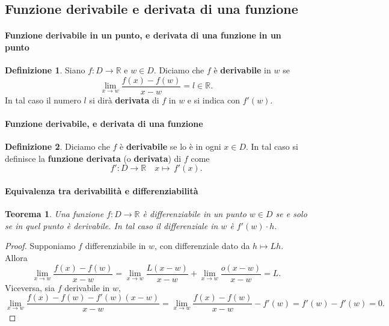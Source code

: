 \documentclass{article}
\theoremstyle{plain}
\newtheorem{thm}{Teorema}[section]
\theoremstyle{definition}
\newtheorem{defn}{Definizione}[section]
\theoremstyle{remark}
\begin{document}
\vspace{10pt}

\subsection{Funzione derivabile e derivata di una funzione}

\vspace{10pt}

\paragraph{Funzione derivabile in un punto, e derivata di una funzione in un punto}
\begin{bxthm}
\begin{defn}
    Siano $f:D\to\mathbb{R}$ e $w\in D$. Diciamo che $f$ è \textbf{derivabile} in $w$ se
    \[\lim_{x\to w}\dfrac{f(x)-f(w)}{x-w}=l\in\mathbb{R}.\]
    In tal caso il numero $l$ si dirà \textbf{derivata} di $f$ in $w$ e si indica con $f'(w)$.
\end{defn}
\end{bxthm}

\vspace{10pt}

\paragraph{Funzione derivabile, e derivata di una funzione}
\begin{bxthm}
\begin{defn}
    Diciamo che $f$ è \textbf{derivabile} se lo è in ogni $x\in D$.
    In tal caso si definisce la \textbf{funzione derivata} (o \textbf{derivata}) di $f$ come 
    \[f':D\to\mathbb{R}\quad x\mapsto \,f'(x).\]
\end{defn}
\end{bxthm}

\vspace{10pt}

\paragraph{Equivalenza tra derivabilità e differenziabilità}
\begin{bxthm}
\begin{thm}
    Una funzione $f:D\to\mathbb{R}$ è differenziabile in un punto $w\in D$ se e solo se in quel punto è derivabile.
    In tal caso il differenziale in $w$ è \(f'(w)\cdot h\).
\end{thm}
\end{bxthm}
\begin{proof}
    Supponiamo $f$ differenziabile in $w$, con differenziale dato da $h\mapsto Lh$. Allora 
    \[\lim_{x\to w}\dfrac{f(x)-f(w)}{x-w}=\lim_{x\to w}\dfrac{L(x-w)}{x-w}+\lim_{x\to w}\dfrac{o(x-w)}{x-w}=L.\]
    Viceversa, sia $f$ derivabile in $w$,
    \[\lim_{x\to w}\dfrac{f(x)-f(w)-f'(w)(x-w)}{x-w}=\lim_{x\to w}\dfrac{f(x)-f(w)}{x-w}-f'(w)=f'(w)-f'(w)=0.\]
\end{proof}
\end{document}
